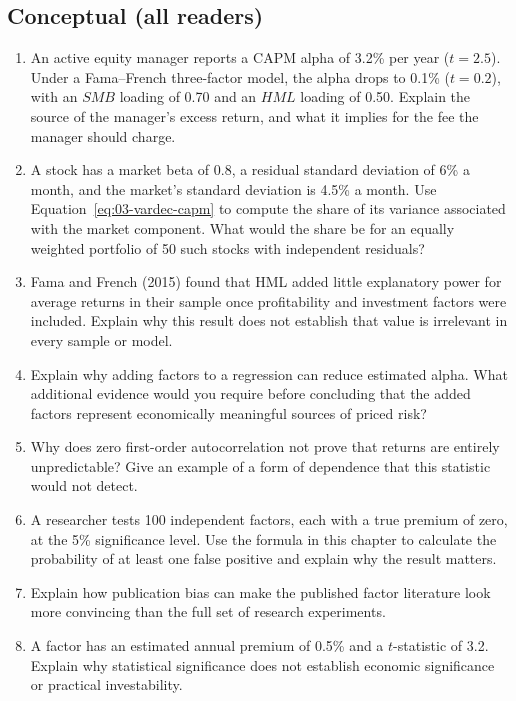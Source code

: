 \subsection*{Conceptual (all readers)}
\begin{enumerate}
  \item An active equity manager reports a CAPM alpha of 3.2\% per year ($t = 2.5$). Under a Fama--French three-factor model, the alpha drops to 0.1\% ($t = 0.2$), with an $SMB$ loading of 0.70 and an $HML$ loading of 0.50. Explain the source of the manager's excess return, and what it implies for the fee the manager should charge.
  \item A stock has a market beta of 0.8, a residual standard deviation of 6\% a month, and the market's standard deviation is 4.5\% a month. Use Equation~\eqref{eq:03-vardec-capm} to compute the share of its variance associated with the market component. What would the share be for an equally weighted portfolio of 50 such stocks with independent residuals?
  \item Fama and French (2015) found that HML added little explanatory power for average returns in their sample once profitability and investment factors were included. Explain why this result does not establish that value is irrelevant in every sample or model.
  \item Explain why adding factors to a regression can reduce estimated alpha. What additional evidence would you require before concluding that the added factors represent economically meaningful sources of priced risk?
  \item Why does zero first-order autocorrelation not prove that returns are entirely unpredictable? Give an example of a form of dependence that this statistic would not detect.
  \item A researcher tests 100 independent factors, each with a true premium of zero, at the 5\% significance level. Use the formula in this chapter to calculate the probability of at least one false positive and explain why the result matters.
  \item Explain how publication bias can make the published factor literature look more convincing than the full set of research experiments.
  \item A factor has an estimated annual premium of 0.5\% and a $t$-statistic of 3.2. Explain why statistical significance does not establish economic significance or practical investability.
\end{enumerate}


